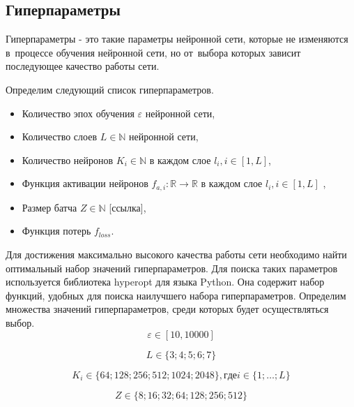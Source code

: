 \subsection{Гиперпараметры}\label{subsec:hyperparameters}

\begin{definition}
  Гиперпараметры - это такие параметры нейронной сети, которые не изменяются в~процессе обучения нейронной сети, но от~выбора которых зависит последующее качество работы сети.
\end{definition}

Определим следующий список гиперпараметров.
\begin{itemize}
  \item Количество эпох обучения $\mathbb{\varepsilon}$ нейронной сети,
  \item Количество слоев $L \in \mathbb{N}$ нейронной сети,
  \item Количество нейронов $K_i \in \mathbb{N}$ в каждом слое $l_i, i \in [1, L]$,
  \item Функция активации\cite[раздел activations]{bib:keras} нейронов $f_{a,i}: \mathbb{R} \rightarrow \mathbb{R}$ в каждом слое $l_i, i \in [1, L]$ ,
  \item Размер батча $Z \in \mathbb{N}$ [ссылка],
  \item Функция потерь\cite[раздел losses]{bib:keras} $f_{loss}$.
\end{itemize}

Для достижения максимально высокого качества работы сети необходимо найти оптимальный набор значений гиперпараметров.
Для поиска таких параметров используется библиотека hyperopt\cite{bib:hyperopt} для языка Python.
Она содержит набор функций, удобных для поиска наилучшего набора гиперпараметров.
\newpage
Определим множества значений гиперпараметров, среди которых будет осуществляться выбор.
\begin{equation}\label{eq:hyper1}
  \mathbb{\varepsilon} \in [10, 10000]
\end{equation}

\begin{equation}\label{eq:hyper1}
  L \in \{3; 4; 5; 6; 7\}
\end{equation}

\begin{equation}\label{eq:hyper2}
  K_i \in \{64; 128; 256; 512; 1024; 2048\}, где i \in \{1; \dots; L\}
\end{equation}

\begin{equation}\label{eq:hyper3}
  Z \in \{8; 16; 32; 64; 128; 256; 512\}
\end{equation}

